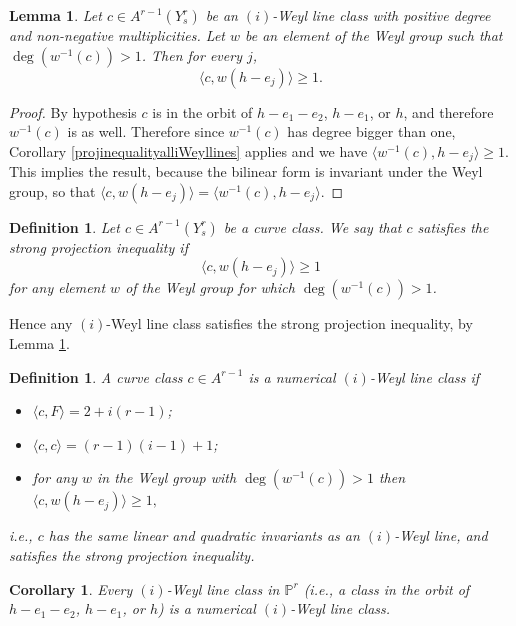 \documentclass[12pt]{article}
\numberwithin{equation}{section}
\newtheorem{lemma}[equation]{Lemma}
\newtheorem{corollary}[equation]{Corollary}
\newtheorem{definition}[equation]{Definition}
\numberwithin{equation}{section}
\numberwithin{subeq}{equation}
\def\bbP{\mathbb{P}}
\begin{document}
\begin{lemma}\label{iWeyllineclassisnumerical}
Let $c\in A^{r-1}(Y^r_s)$ be an $(i)$-Weyl line class 
with positive degree and non-negative multiplicities.
Let $w$ be an element of the Weyl group
such that $\deg(w^{-1}(c))>1$.
Then for every $j$,
\[
\langle c, w(h-e_j) \rangle \geq 1.
\]
\end{lemma}


\begin{proof}
By hypothesis $c$ is in the orbit of $h-e_1-e_2$, $h-e_1$, or $h$,
and therefore $w^{-1}(c)$ is as well.
Therefore since $w^{-1}(c)$ has degree bigger than one,
Corollary \ref{projinequalityalliWeyllines} applies and we have
$\langle w^{-1}(c), h-e_j \rangle \geq 1$.
This implies the result, because the bilinear form is invariant under the Weyl group,
so that $\langle c, w(h-e_j) \rangle = \langle w^{-1}(c), h-e_j \rangle$.
\end{proof}

\begin{definition}\label{strong}
Let $c\in A^{r-1}(Y^r_{s})$ be a curve class.
We say that $c$ satisfies the \emph{strong projection inequality} if
\[
\langle c, w(h-e_j)\rangle \geq 1
\]
for any element $w$ of the Weyl group for which $\deg(w^{-1}(c))>1$.
\end{definition}

Hence any $(i)$-Weyl line class satisfies the strong projection inequality,
by Lemma \ref{iWeyllineclassisnumerical}.


\begin{definition}
A curve class $c \in A^{r-1}$ is a \emph{numerical $(i)$-Weyl line class} if
\begin{itemize}
\item[(a)] $\langle c, F \rangle = 2+i(r-1)$;
\item[(b)] $\langle c, c \rangle = (r-1)(i-1)+1$;
\item[(c)] for any $w$ in the Weyl group with $\deg(w^{-1}(c))>1$ then
$\langle c, w(h-e_j)\rangle\geq 1,$
\end{itemize}
i.e., $c$ has the same linear and quadratic invariants as an $(i)$-Weyl line,
and satisfies the strong projection inequality.
\end{definition}	

\begin{corollary}\label{iWeylisnumerical}
Every $(i)$-Weyl line class in $\bbP^r$
(i.e., a class in the orbit of $h-e_1-e_2$, $h-e_1$, or $h$)
is a numerical $(i)$-Weyl line class.
\end{corollary}
\end{document}
